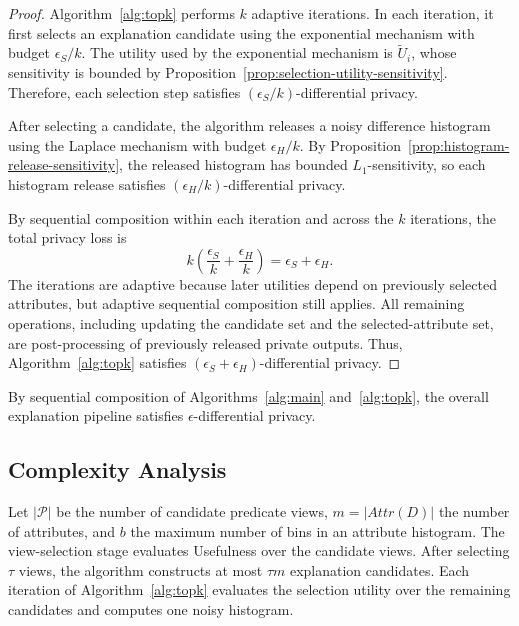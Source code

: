 \begin{proof}
Algorithm~\ref{alg:topk} performs $k$ adaptive iterations.
In each iteration, it first selects an explanation candidate using the exponential mechanism with budget $\epsilon_S/k$.
The utility used by the exponential mechanism is $\widetilde{U}_i$, whose sensitivity is bounded by Proposition~\ref{prop:selection-utility-sensitivity}.
Therefore, each selection step satisfies $(\epsilon_S/k)$-differential privacy.

After selecting a candidate, the algorithm releases a noisy difference histogram using the Laplace mechanism with budget $\epsilon_H/k$.
By Proposition~\ref{prop:histogram-release-sensitivity}, the released histogram has bounded $L_1$-sensitivity, so each histogram release satisfies $(\epsilon_H/k)$-differential privacy.

By sequential composition within each iteration and across the $k$ iterations, the total privacy loss is
\[
    k\left(\frac{\epsilon_S}{k}+\frac{\epsilon_H}{k}\right)
    =
    \epsilon_S+\epsilon_H.
\]
The iterations are adaptive because later utilities depend on previously selected attributes, but adaptive sequential composition still applies.
All remaining operations, including updating the candidate set and the selected-attribute set, are post-processing of previously released private outputs.
Thus, Algorithm~\ref{alg:topk} satisfies $(\epsilon_S+\epsilon_H)$-differential privacy.
\end{proof}

\begin{corollary}
\label{cor:end-to-end-dp}
By sequential composition of Algorithms~\ref{alg:main} and~\ref{alg:topk}, the overall explanation pipeline satisfies $\epsilon$-differential privacy.
\end{corollary}

\subsection{Complexity Analysis}
\label{subsec:complexity-analysis}

Let $|\mathcal{P}|$ be the number of candidate predicate views, $m=|Attr(D)|$ the number of attributes, and $b$ the maximum number of bins in an attribute histogram.
The view-selection stage evaluates Usefulness over the candidate views.
After selecting $\tau$ views, the algorithm constructs at most $\tau m$ explanation candidates.
Each iteration of Algorithm~\ref{alg:topk} evaluates the selection utility over the remaining candidates and computes one noisy histogram.
